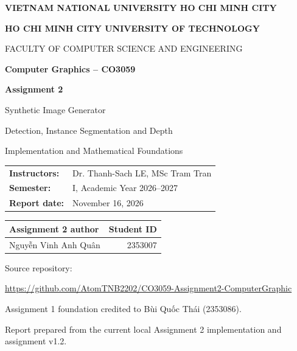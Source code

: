 \documentclass[12pt,a4paper]{article}
\begin{document}
\begin{titlepage}\centering
{\normalsize\bfseries VIETNAM NATIONAL UNIVERSITY HO CHI MINH CITY\par}
{\normalsize\bfseries HO CHI MINH CITY UNIVERSITY OF TECHNOLOGY\par}
{\small FACULTY OF COMPUTER SCIENCE AND ENGINEERING\par}\vspace{20mm}
{\large\bfseries Computer Graphics -- CO3059\par}\vspace{8mm}
{\Huge\bfseries Assignment 2\par}\vspace{7mm}
{\LARGE Synthetic Image Generator\par}\vspace{3mm}
{\Large Detection, Instance Segmentation and Depth\par}\vspace{9mm}
{\large Implementation and Mathematical Foundations\par}\vspace{14mm}
\begin{tabular}{ll}
\textbf{Instructors:} & Dr. Thanh-Sach LE, MSc Tram Tran\\
\textbf{Semester:} & I, Academic Year 2026--2027\\
\textbf{Report date:} & November 16, 2026
\end{tabular}\par\vspace{10mm}
\begin{tabularx}{0.85\linewidth}{@{}Xr@{}}
\toprule \textbf{Assignment 2 author} & \textbf{Student ID}\\\midrule
Nguyễn Vinh Anh Quân & 2353007\\\bottomrule
\end{tabularx}\vfill
\small Source repository:\par
\url{https://github.com/AtomTNB2202/CO3059-Assignment2-ComputerGraphic}\par\vspace{5mm}
Assignment 1 foundation credited to Bùi Quốc Thái (2353086).\par
Report prepared from the current local Assignment 2 implementation and assignment v1.2.
\end{titlepage}
\end{document}
